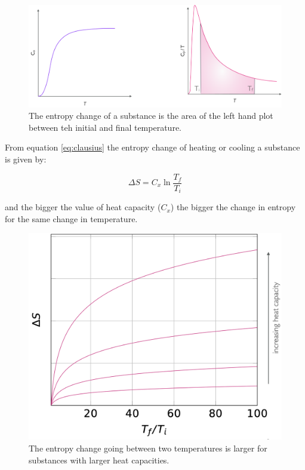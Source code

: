 \documentclass[
]{book}
\begin{document}
\begin{figure}

{\centering \includegraphics[width=0.8\linewidth]{images/entropytemp} 

}

\caption{The entropy change of a substance is the area of the left hand plot between teh initial and final temperature.}\label{fig:entropytemp}
\end{figure}

From equation \eqref{eq:clausius} the entropy change of heating or cooling a substance is given by:

\begin{equation}
\Delta S=C_x \ln \frac{T_f}{T_i}
\label{eq:entropytemp}
\end{equation}

and the bigger the value of heat capacity (\(C_x\)) the bigger the change in entropy for the same change in temperature.

\begin{figure}

{\centering \includegraphics[width=0.8\linewidth]{images/entropyheatcapacity} 

}

\caption{The entropy change going between two temperatures is larger for substances with larger heat capacities.}\label{fig:entropyheatcapacity}
\end{figure}
\end{document}
